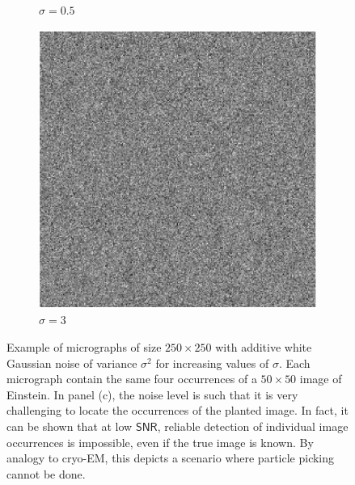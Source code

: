 \documentclass[english,11pt]{article}
\newcommand{\1}{\mathbf{1}}
\numberwithin{equation}{section}
\theoremstyle{plain}
\theoremstyle{definition}
\theoremstyle{remark}
\theoremstyle{plain}
\theoremstyle{remark}
\theoremstyle{plain}
\theoremstyle{plain}
\newcommand{\SNR}{\ensuremath{\textsf{SNR}}}
\begin{document}
\begin{figure}[t]
\begin{subfigure}[h]{0.33\textwidth}
		\caption{$\sigma = 0.5$}
	\end{subfigure}
	\begin{subfigure}[h]{0.33\textwidth}
		\centering
		\includegraphics[scale=0.5]{micrograph_Einstein_example_s3}
		\caption{$\sigma = 3$}
	\end{subfigure}
	\caption{\label{fig:micro_example} Example of micrographs of size $250\times 250$ with additive white Gaussian noise of variance $\sigma^2$ for increasing values of $\sigma$. Each micrograph contain the same four occurrences of a $50 \times 50$ image of Einstein. In panel (c), the noise level is such that it is very challenging to locate the occurrences of the planted image. In fact, it can be shown that at low $\SNR$, reliable detection of individual image occurrences is impossible, even if the true image is known. By analogy to cryo-EM, this depicts a scenario where particle picking cannot be done.}	
\end{figure}
\end{document}
